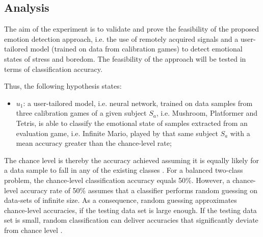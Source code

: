 \subsection{Analysis}

The aim of the experiment is to validate and prove the feasibility of the proposed emotion detection approach, i.e. the use of remotely acquired signals and a user-tailored model (trained on data from calibration games) to detect emotional states of stress and boredom. The feasibility of the approach will be tested in terms of classification accuracy.

Thus, the following hypothesis states:

\begin{itemize}
  \item $u_1$: a user-tailored model, i.e. neural network, trained on data samples from three calibration games of a given subject $S_a$, i.e. Mushroom, Platformer and Tetris, is able to classify the emotional state of samples extracted from an evaluation game, i.e. Infinite Mario, played by that same subject $S_a$ with a mean accuracy greater than the chance-level rate;
\end{itemize}

The chance level is thereby the accuracy achieved assuming it is equally likely for a data sample to fall in any of the existing classes \parencite{kassraian2016promises}. For a balanced two-class problem, the chance-level classification accuracy equals 50\%. However, a chance-level accuracy rate of 50\% assumes that a classifier performs random guessing on data-sets of infinite size. As a consequence, random guessing approximates chance-level accuracies, if the testing data set is large enough. If the testing data set is small, random classification can deliver accuracies that significantly deviate from chance level \parencite{combrisson2015exceeding}.

